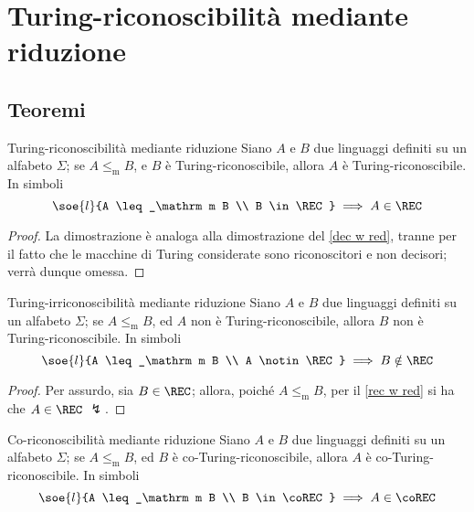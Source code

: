 \documentclass[a4paper, 12pt]{report}
\begin{document}
    \section{Turing-riconoscibilità mediante riduzione}

    \subsection{Teoremi}

    \begin{framedthm}[label={rec w red}]{Turing-riconoscibilità mediante riduzione}
        Siano $A$ e $B$ due linguaggi definiti su un alfabeto $\Sigma$; se $A \leq_\mathrm m B$, e $B$ è Turing-riconoscibile, allora $A$ è Turing-riconoscibile. In simboli $$\soe{l}{A \leq_\mathrm m B \\ B \in \REC} \implies A \in \REC$$
    \end{framedthm}

    \begin{proof}
        La dimostrazione è analoga alla dimostrazione del \cref{dec w red}, tranne per il fatto che le macchine di Turing considerate sono riconoscitori e non decisori; verrà dunque omessa.
    \end{proof}

    \begin{framedcor}[label={rec w red cor}]{Turing-irriconoscibilità mediante riduzione}
        Siano $A$ e $B$ due linguaggi definiti su un alfabeto $\Sigma$; se $A \leq_\mathrm m B$, ed $A$ non è Turing-riconoscibile, allora $B$ non è Turing-riconoscibile. In simboli $$\soe{l}{A \leq_\mathrm m B \\ A \notin \REC} \implies B \notin \REC$$
    \end{framedcor}

    \begin{proof}
        Per assurdo, sia $B \in \REC$; allora, poiché $A \leq_\mathrm m B$, per il \cref{rec w red} si ha che $A \in \REC$ $\lightning$.
    \end{proof}

    \begin{framedcor}[label={corec w red}]{Co-riconoscibilità mediante riduzione}
        Siano $A$ e $B$ due linguaggi definiti su un alfabeto $\Sigma$; se $A \leq_\mathrm m B$, ed $B$ è co-Turing-riconoscibile, allora $A$ è co-Turing-riconoscibile. In simboli $$\soe{l}{A \leq_\mathrm m B \\ B \in \coREC} \implies A \in \coREC$$
    \end{framedcor}
\end{document}
